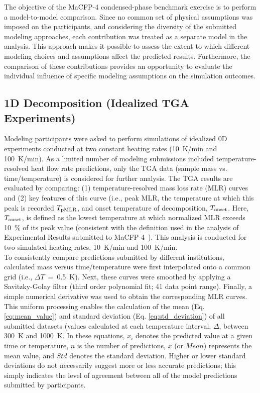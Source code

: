 \documentclass{article}
\begin{document}
The objective of the MaCFP-4 condensed-phase benchmark exercise is to perform a model-to-model comparison. Since no common set of physical assumptions was imposed on the participants, and considering the diversity of the submitted modeling approaches, each contribution was treated as a separate model in the analysis. This approach makes it possible to assess the extent to which different modeling choices and assumptions affect the predicted results. Furthermore, the comparison of these contributions provides an opportunity to evaluate the individual influence of specific modeling assumptions on the simulation outcomes.

\subsection{1D Decomposition (Idealized TGA Experiments)}
Modeling participants were asked to perform simulations of idealized 0D experiments conducted at two constant heating rates (10~K/min and 100~K/min). As a limited number of modeling submissions included temperature-resolved heat flow rate predictions, only the TGA data (sample mass vs. time/temperature) is considered for further analysis. The TGA results are evaluated by comparing: (1) temperature-resolved mass loss rate (MLR) curves and (2) key features of this curve (i.e., peak MLR, the temperature at which this peak is recorded $T_{\rm{pMLR}}$, and onset temperature of decomposition, $T_{\rm{onset}}$. Here, $T_{\rm{onset}}$,  is defined as the lowest temperature at which normalized MLR exceeds 10~\% of its peak value (consistent with the definition used in the analysis of Experimental Results submitted to MaCFP-4~\cite{MaCFP4PyrolysisExp}). This analysis is conducted for two simulated heating rates, 10~K/min and 100~K/min.\\

To consistently compare predictions submitted by different institutions, calculated mass versus time/temperature were first interpolated onto a common grid (i.e., $\Delta T$~=~0.5~K). Next, these curves were smoothed by applying a Savitzky-Golay filter (third order polynomial fit; 41 data point range). Finally, a simple numerical derivative was used to obtain the corresponding MLR curves. This uniform processing enables the calculation of the mean (Eq. \ref{eq:mean_value}) and standard deviation (Eq. \ref{eq:std_deviation}) of all submitted datasets (values calculated at each temperature interval, $\Delta$, between 300~K and 1000~K. In these equations, $x_i$ denotes the predicted value at a given time or temperature, $n$ is the number of predictions, $\bar{x}$ (or $Mean$) represents the mean value, and $Std$ denotes the standard deviation.  Higher or lower standard deviations do not necessarily suggest more or less accurate predictions; this simply indicates the level of agreement between all of the model predictions submitted by participants.
\end{document}
